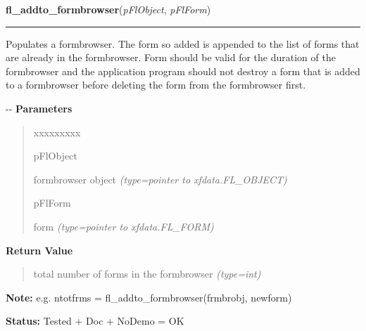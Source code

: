     \vspace{0.5ex}

\hspace{.8\funcindent}\begin{boxedminipage}{\funcwidth}

    \raggedright \textbf{fl\_addto\_formbrowser}(\textit{pFlObject}, \textit{pFlForm})

    \vspace{-1.5ex}

    \rule{\textwidth}{0.5\fboxrule}
\setlength{\parskip}{2ex}

Populates a formbrowser. The form so added is appended to the list of
forms that are already in the formbrowser. Form should be valid for the
duration of the formbrowser and the application program should not destroy
a form that is added to a formbrowser before deleting the form from the
formbrowser first.

-{}-
\setlength{\parskip}{1ex}
      \textbf{Parameters}
      \vspace{-1ex}

      \begin{quote}
        \begin{Ventry}{xxxxxxxxx}

          \item[pFlObject]


formbrowser object
            {\it (type=pointer to xfdata.FL\_OBJECT)}

          \item[pFlForm]


form
            {\it (type=pointer to xfdata.FL\_FORM)}

        \end{Ventry}

      \end{quote}

      \textbf{Return Value}
    \vspace{-1ex}

      \begin{quote}

total number of forms in the formbrowser
      {\it (type=int)}

      \end{quote}

\textbf{Note:} 
e.g. ntotfrms = fl\_addto\_formbrowser(frmbrobj, newform)


\textbf{Status:} 
Tested + Doc + NoDemo = OK


    \end{boxedminipage}

